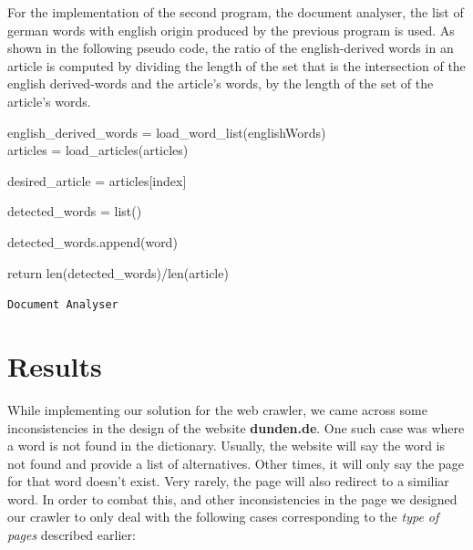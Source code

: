 \documentclass{article}
\begin{document}
For the implementation of the second program, the document analyser, the list of german words with english origin produced by the previous program is used. As shown in the following pseudo code, the ratio of the english-derived words in an article is computed by dividing the length of the set that is the intersection of the english derived-words and the article's words, by the length of the set of the article's words.
\begin{center}
	\begin{minipage}{0.8\linewidth} %
		\begin{algorithm}[H]
			\medskip
			english\_derived\_words = load\_word\_list(englishWords)\\
			articles = load\_articles(articles)\\
			\medskip

			desired\_article = articles[index]

			detected\_words = list()

			 {
				 {
					detected\_words.append(word)
				}
			}

			return len(detected\_words)/len(article)

			\caption{\texttt{Document Analyser}} %
			\label{alg:fastTwoSum}   %
		\end{algorithm}
	\end{minipage}
\end{center}

\section{Results}
While implementing our solution for the web crawler, we came across some inconsistencies in the design of the website \textbf{dunden.de}. One such case was where a word is not found in the dictionary. Usually, the website will say the word is not found and provide a list of alternatives. Other times, it will only say the page for that word doesn't exist. Very rarely, the page will also redirect to a similiar word. In order to combat this, and other inconsistencies in the page we designed our crawler to only deal with the following cases corresponding to the \textit{type of pages} described earlier:
\end{document}
